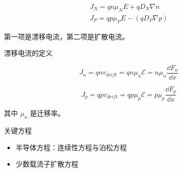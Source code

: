 \documentclass[cn,11pt,chinese,black,simple]{../elegantbook}
\begin{document}
\begin{equation*}
    \begin{array}{l}
        J _{N}=q n \mu_{N} E+q D_{N} \nabla n \\
        J _{P}=q p \mu_{P} E-\left(q D_{P} \nabla p\right) 
    \end{array}
\end{equation*}

第一项是漂移电流，第二项是扩散电流。


漂移电流的定义 

\[J_n = q n v_{drift} = q n \mu_n \mathscr{E} = n \mu_n \frac{\dd{F_n}}{\dd{x}}\]

\[J_p = q p v_{drift} = q p \mu_p \mathscr{E} = p \mu_p \frac{\dd{F_p}}{\dd{x}}\]

其中 \(\mu_n\) 是迁移率。

关键方程

\begin{itemize}
    \item 半导体方程：连续性方程与泊松方程
    \item 少数载流子扩散方程
\end{itemize}


% 
\let\chapname\undefined
\ifx\mainclass\undefined
\end{document}
